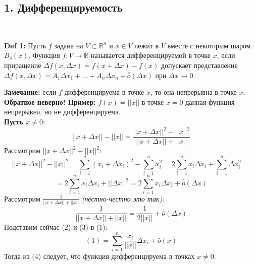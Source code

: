 \documentclass[book, 11pt]{report}
\begin{document}
        \subsection*{1. Дифференцируемость}
        \par{\ }
        \par{\textbf{Def 1: }Пусть $f$ задана на $V\subset\mathbb{R}^n$ и $x\in V$ лежит в $V$ вместе с некоторым шаром $B_{\delta}(x)$. Функция $f:V\to\mathbb{R}$ называется дифференцируемой в точке $x$, если приращение $\Delta f(x,\Delta x)=f(x+\Delta x)-f(x)$ допускает представление $\Delta f(x,\Delta x)=A_1\Delta x_1+\ldots+A_n\Delta x_n+\bar{\bar{o}}(\Delta x)$ при $\Delta x\to0$.}
        \vspace{0.4cm}
        \par{\textbf{Замечание: }если $f$ дифференцируема в точке $x$, то она непрерывна в точке $x$.\\\textbf{Обратное неверно! Пример: } $f(x)=||x||$ в точке $x=0$ данная функция непрерывна, но не дифференцируема.\\ \textbf{Пусть $x\neq0:$}
        \begin{equation}
            ||x+\Delta x||-||x||=\frac{||x+\Delta x||^2-||x||^2}{||x+\Delta x||+||x||}
        \end{equation}
        Рассмотрим $||x+\Delta x||^2-||x||^2$:
        \begin{equation*}
            ||x+\Delta x||^2-||x||^2=\sum_{i=1}^{n}(x_i+\Delta x_i)^2-\sum_{i=1}^{n}x_i^2=2\sum_{i=1}^nx_i\Delta x_i+\sum_{i=1}^n\Delta x_i^2=
        \end{equation*}
        \begin{equation}
            =2\sum_{i=1}^nx_i\Delta x_i+||\Delta x||^2=2\sum_{i=1}^nx_i\Delta x_i+\bar{\bar{o}}(\Delta x)
        \end{equation}
        Рассмотрим $\frac{1}{||x+\Delta x||+||x||}$ \textit{(честно-честно это так)}:
        \begin{equation}
            \frac{1}{||x+\Delta x||+||x||}=\frac{1}{2||x||}+\bar{\bar{o}}(\Delta x)
        \end{equation}
        Подставим сейчас (2) и (3) в (1):
        \begin{equation}
            (1)=\sum_{i=1}^n\frac{x_i}{||x||}\Delta x_i + \bar{\bar{o}}(x)
        \end{equation}
        Тогда из (4) следует, что функция дифференцируема в точках $x\neq0$.\\
}
\end{document}
